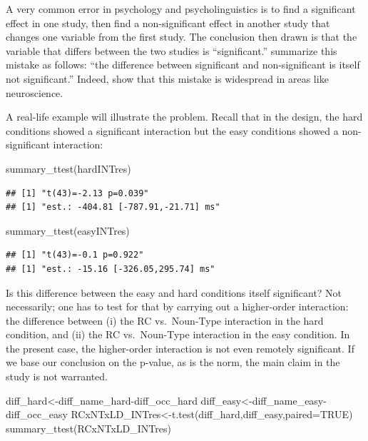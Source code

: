 \documentclass[
  12pt,
]{krantz}
\newenvironment{Shaded}{\begin{snugshade}}{\end{snugshade}}
\newcommand{\AttributeTok}[1]{\textcolor[rgb]{0.77,0.63,0.00}{#1}}
\newcommand{\ConstantTok}[1]{\textcolor[rgb]{0.00,0.00,0.00}{#1}}
\newcommand{\FunctionTok}[1]{\textcolor[rgb]{0.00,0.00,0.00}{#1}}
\newcommand{\NormalTok}[1]{#1}
\newcommand{\OtherTok}[1]{\textcolor[rgb]{0.56,0.35,0.01}{#1}}
\newcommand{\SpecialCharTok}[1]{\textcolor[rgb]{0.00,0.00,0.00}{#1}}
\theoremstyle{definition}
\theoremstyle{definition}
\theoremstyle{definition}
\theoremstyle{definition}
\theoremstyle{remark}
\begin{document}
A very common error in psychology and psycholinguistics is to find a significant effect in one study, then find a non-significant effect in another study that changes one variable from the first study. The conclusion then drawn is that the variable that differs between the two studies is ``significant.'' \citet{gelmanhill07} summarize this mistake as follows: ``the difference between significant and non-significant is itself not significant.'' Indeed, \citet{nieuwenhuis2011erroneous} show that this mistake is widespread in areas like neuroscience.

A real-life example will illustrate the problem. Recall that in the \citet{fedorenko2006nature} design, the hard conditions showed a significant interaction but the easy conditions showed a non-significant interaction:

\begin{Shaded}
\begin{Highlighting}[]
\FunctionTok{summary\_ttest}\NormalTok{(hardINTres)}
\end{Highlighting}
\end{Shaded}

\begin{verbatim}
## [1] "t(43)=-2.13 p=0.039"
## [1] "est.: -404.81 [-787.91,-21.71] ms"
\end{verbatim}

\begin{Shaded}
\begin{Highlighting}[]
\FunctionTok{summary\_ttest}\NormalTok{(easyINTres)}
\end{Highlighting}
\end{Shaded}

\begin{verbatim}
## [1] "t(43)=-0.1 p=0.922"
## [1] "est.: -15.16 [-326.05,295.74] ms"
\end{verbatim}

Is this difference between the easy and hard conditions itself significant? Not necessarily; one has to test for that by carrying out a higher-order interaction: the difference between (i) the RC vs.~Noun-Type interaction in the hard condition, and (ii) the RC vs.~Noun-Type interaction in the easy condition.
In the present case, the higher-order interaction is not even remotely significant. If we base our conclusion on the p-value, as is the norm, the main claim in the \citet{fedorenko2006nature} study is not warranted.

\begin{Shaded}
\begin{Highlighting}[]
\NormalTok{diff\_hard}\OtherTok{\textless{}{-}}\NormalTok{diff\_name\_hard}\SpecialCharTok{{-}}\NormalTok{diff\_occ\_hard}
\NormalTok{diff\_easy}\OtherTok{\textless{}{-}}\NormalTok{diff\_name\_easy}\SpecialCharTok{{-}}\NormalTok{diff\_occ\_easy}
\NormalTok{RCxNTxLD\_INTres}\OtherTok{\textless{}{-}}\FunctionTok{t.test}\NormalTok{(diff\_hard,diff\_easy,}\AttributeTok{paired=}\ConstantTok{TRUE}\NormalTok{)}
\FunctionTok{summary\_ttest}\NormalTok{(RCxNTxLD\_INTres)}
\end{Highlighting}
\end{Shaded}
\end{document}
